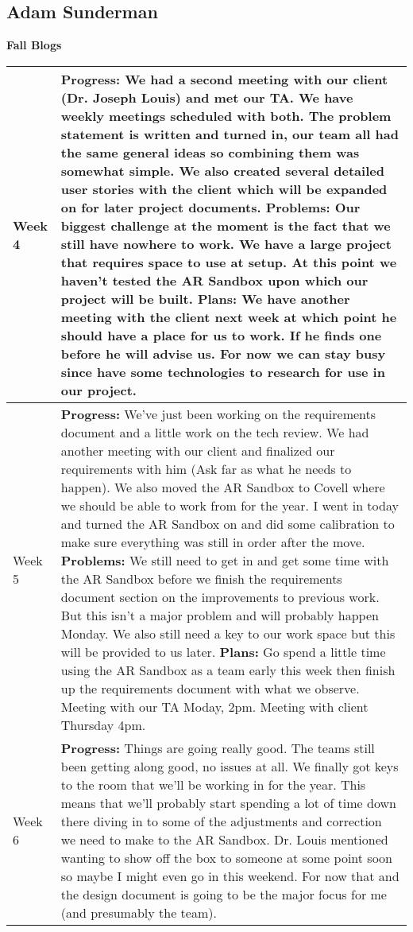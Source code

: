 \documentclass[letterpaper, 10pt, onecolumn, draftclsnofoot]{IEEEtran}
\begin{document}
    \subsection{Adam Sunderman}
        \begin{center}
        \large{\textbf{Fall Blogs}} \\
        \begin{longtable}{|p{4cm}|p{10cm}|}
            \hline
            Week 4 & \textbf{Progress:} We had a second meeting with our client (Dr. Joseph Louis) and met our TA. We have weekly meetings scheduled with both. The problem statement is written and turned in, our team all had the same general ideas so combining them was somewhat simple. We also created several detailed user stories with the client which will be expanded on for later project documents. \textbf{Problems:} Our biggest challenge at the moment is the fact that we still have nowhere to work. We have a large project that requires space to use at setup. At this point we haven't tested the AR Sandbox upon which our project will be built. \textbf{Plans:} We have another meeting with the client next week at which point he should have a place for us to work. If he finds one before he will advise us. For now we can stay busy since have some technologies to research for use in our project. \\
            \hline
            Week 5 & \textbf{Progress:} We've just been working on the requirements document and a little work on the tech review. We had another meeting with our client and finalized our requirements with him (Ask far as what he needs to happen). We also moved the AR Sandbox to Covell where we should be able to work from for the year. I went in today and turned the AR Sandbox on and did some calibration to make sure everything was still in order after the move. \textbf{Problems:} We still need to get in and get some time with the AR Sandbox before we finish the requirements document section on the improvements to previous work. But this isn't a major problem and will probably happen Monday. We also still need a key to our work space but this will be provided to us later. \textbf{Plans:} Go spend a little time using the AR Sandbox as a team early this week then finish up the requirements document with what we observe. Meeting with our TA Moday, 2pm. Meeting with client Thursday 4pm.  \\
            \hline
            Week 6 & \textbf{Progress:} Things are going really good. The teams still been getting along good, no issues at all. We finally got keys to the room that we'll be working in for the year. This means that we'll probably start spending a lot of time down there diving in to some of the adjustments and correction we need to make to the AR Sandbox. Dr. Louis mentioned wanting to show off the box to someone at some point soon so maybe I might even go in this weekend. For now that and the design document is going to be the major focus for me (and presumably the team). \\

\end{longtable}
\end{center}
\end{document}
